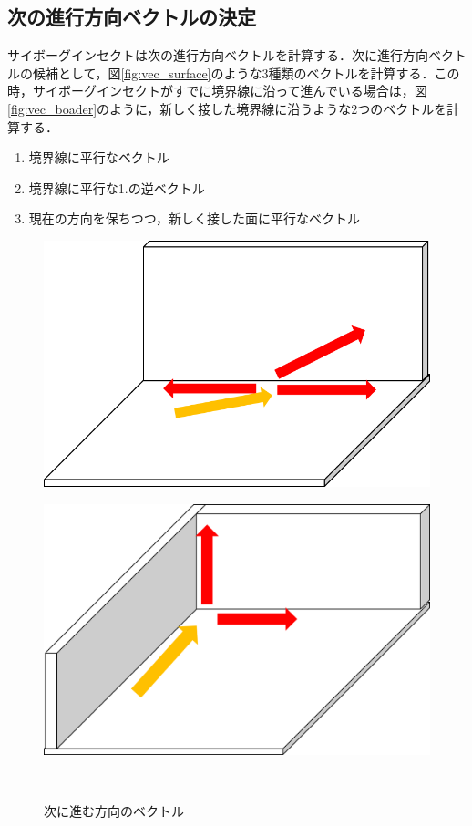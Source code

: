 \documentclass[a4paper,11pt]{jarticle}
\begin{document}
	\subsection{次の進行方向ベクトルの決定}
	\label{vector}
	サイボーグインセクトは次の進行方向ベクトルを計算する．次に進行方向ベクトルの候補として，図\ref{fig:vec_surface}のような3種類のベクトルを計算する．この時，サイボーグインセクトがすでに境界線に沿って進んでいる場合は，図\ref{fig:vec_boader}のように，新しく接した境界線に沿うような2つのベクトルを計算する．
	\begin{enumerate}
		\item 境界線に平行なベクトル
		\item 境界線に平行な1.の逆ベクトル
		\item 現在の方向を保ちつつ，新しく接した面に平行なベクトル
	\end{enumerate}
	\begin{figure}
		\begin{minipage}{0.5\linewidth}
			\centering
			\includegraphics[width=1\linewidth]{png/vector.png}
			\label{fig:vec_surface}
		\end{minipage}
		\begin{minipage}{0.5\linewidth}
			\centering
			\includegraphics[width=1\linewidth]{png/vector2.png}
			\label{fig:vec_boader}
		\end{minipage}\\
		\caption{次に進む方向のベクトル}
		\label{fig:vector}
	\end{figure}
	
\end{document}
